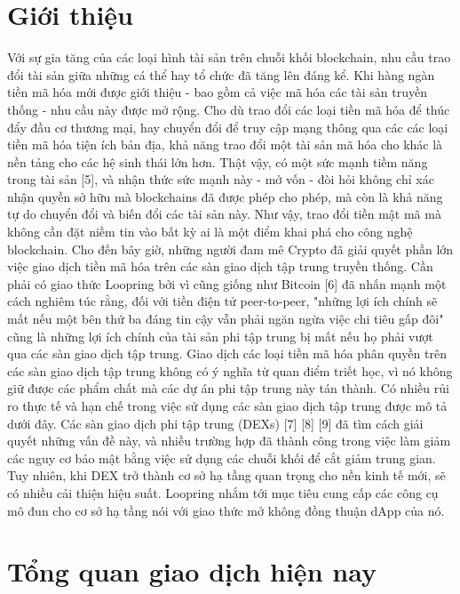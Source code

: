 \documentclass[12pt,a4paper]{article}
\begin{document}
\begin{multicols}{2}
\section{Giới thiệu\label{sec:introduction}}
Với sự gia tăng của các loại hình tài sản trên chuỗi khối blockchain, nhu cầu trao đổi tài sản giữa những cá thể hay tổ chức đã tăng lên đáng kể. Khi hàng ngàn tiền mã hóa mới được giới thiệu - bao gồm cả việc mã hóa các tài sản truyền thống - nhu cầu này được mở rộng. Cho dù trao đổi các loại tiền mã hóa để thúc đẩy đầu cơ thương mại, hay chuyển đổi để truy cập mạng thông qua các các loại tiền mã hóa tiện ích bản địa, khả năng trao đổi một tài sản mã hóa cho khác là nền tảng cho các hệ sinh thái lớn hơn. Thật vậy, có một sức mạnh tiềm năng trong tài sản [5], và nhận thức sức mạnh này - mở vốn - đòi hỏi không chỉ xác nhận quyền sở hữu mà blockchains đã được phép cho phép, mà còn là khả năng tự do chuyển đổi và biến đổi các tài sản này.
Như vậy, trao đổi tiền mật mã mà không cần đặt niềm tin vào bất kỳ ai là một điểm khai phá cho công nghệ blockchain. Cho đến bây giờ, những người đam mê Crypto đã giải quyết phần lớn việc giao dịch tiền mã hóa trên các sàn giao dịch tập trung truyền thống. Cần phải có giao thức Loopring bởi vì cũng giống như Bitcoin [6] đã nhấn mạnh một cách nghiêm túc rằng, đối với tiền điện tử peer-to-peer, "những lợi ích chính sẽ mất nếu một bên thứ ba đáng tin cậy vẫn phải ngăn ngừa việc chi tiêu gấp đôi" cũng là những lợi ích chính của tài sản phi tập trung bị mất nếu họ phải vượt qua các sàn giao dịch tập trung.
Giao dịch các loại tiền mã hóa phân quyền trên các sàn giao dịch tập trung không có ý nghĩa từ quan điểm triết học, vì nó không giữ được các phẩm chất mà các dự án phi tập trung này tán thành. Có nhiều rủi ro thực tế và hạn chế trong việc sử dụng các sàn giao dịch tập trung được mô tả dưới đây. Các sàn giao dịch phi tập trung (DEXs) [7] [8] [9] đã tìm cách giải quyết những vấn đề này, và nhiều trường hợp đã thành công trong việc làm giảm các nguy cơ bảo mật bằng việc sử dụng các chuỗi khối để cắt giảm trung gian. Tuy nhiên, khi DEX trở thành cơ sở hạ tầng quan trọng cho nền kinh tế mới, sẽ có nhiều cải thiện hiệu suất. Loopring nhắm tới mục tiêu cung cấp các công cụ mô đun cho cơ sở hạ tầng nói với giao thức mở không đồng thuận dApp của nó.

\section{Tổng quan giao dịch hiện nay\label{sec:current_exchange_landscape}}


\end{multicols}
\end{document}
